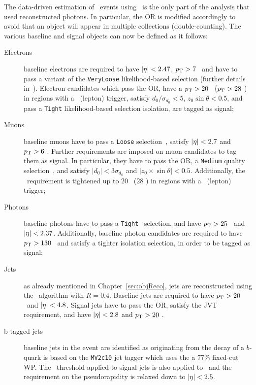 		The data-driven estimation of \ttZ\ events using \ttgamma\ is the only part of the analysis that used reconstructed photons. In particular, the \ac{OR} is modified accordingly to avoid that an object will appear in multiple collections (double-counting). The various baseline and signal objects can now be defined as it follows:

		\begin{description}
			\item[Electrons] 
				baseline electrons are required to have $|\eta| < 2.47$, $p_{\mathrm{T}} > 7$ \GeV\ and have to pass a variant of the \texttt{VeryLoose} likelihood-based selection (further details in~\cite{egamma, egamma2}). Electron candidates which pass the \ac{OR}, have a $p_{\mathrm{T}} > 20$ \gev\ ($p_{\mathrm{T}} > 28$ \GeV) in regions with a \met\ (lepton) trigger, satisfy $d_0/\sigma_{d_{0}} < 5$, $z_0 \sin \theta < 0.5$, and pass a \texttt{Tight} likelihood-based selection isolation, are tagged as signal;

			\item[Muons] 	
				baseline muons have to pass a \texttt{Loose} selection~\cite{PERF-2015-10}, satisfy $|\eta| < 2.7$ and $p_{\mathrm{T}} > 6$ \GeV. Further requirements are imposed on muon candidates to tag them as signal. In particular, they have to pass the \ac{OR}, a \texttt{Medium} quality selection~\cite{PERF-2015-10}, and satisfy
				$|d_0|< 3 \sigma_{d_0}$ and $|z_0 \times \sin \theta |<0.5$. Additionally, the \pt\ requirement is tightened up to $20$ \gev\ ($28$ \GeV) in regions with a \met\ (lepton) trigger;

			\item[Photons]
				baseline photons have to pass a \texttt{Tight}~\cite{Aaboud:2016yuq} selection, and have $p_{\mathrm{T}} > 25$ \GeV\ and $|\eta| < 2.37$. Additionally, baseline photon candidates are required to have $p_{\mathrm{T}} > 130$ \GeV\ and satisfy a tighter isolation selection, in order to be tagged as signal;
			
			\item[Jets]
				as already mentioned in Chapter~\ref{sec:objReco}, jets are reconstructed using the \antikt\ algorithm with $R=0.4$. Baseline jets are required to have $p_{\mathrm{T}}>20$ \GeV\ and $|\eta|< 4.8$. Signal jets have to pass the \ac{OR}, satisfy the \ac{JVT} requirement, and have $|\eta| < 2.8$ and $p_{\mathrm{T}} > 20$ \GeV. 

			\item[b-tagged jets]
				baseline jets in the event are identified as originating from the decay of a $b$-quark is based on the \texttt{MV2c10} jet tagger which uses the a $77\%$ fixed-cut WP. The \pt\ threshold applied to signal jets is also applied to \bj\ and the requirement on the pseudorapidity is relaxed down to $|\eta| < 2.5$.
			

\end{description}
